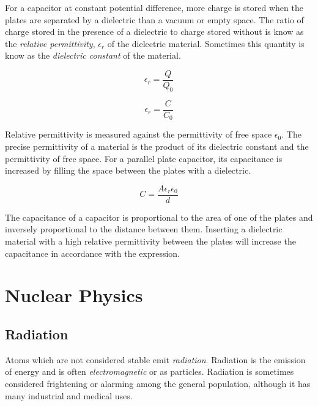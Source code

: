 \documentclass[12pt]{article}
\begin{document}
For a capacitor at constant potential difference, more charge is stored when the plates are separated by a dielectric than a vacuum or empty space. The ratio of charge stored in the presence of a dielectric to charge stored without is know as the \emph{relative permittivity}, \(\epsilon_r\) of the dielectric material. Sometimes this quantity is know as the \emph{dielectric constant} of the material.

\begin{figure}[H]
\centering
\begin{minipage}{0.8\textwidth}
\begin{tcolorbox}[
sharp corners=all,
colback=white,
colframe=white,
size=tight,
boxrule=0.2mm,
left=10mm, right=10mm
]
\begin{multicols}{2}
\[{\epsilon}_r = \dfrac{Q}{Q_0}\]

\columnbreak

\[{\epsilon}_r = \dfrac{C}{C_0}\]
\end{multicols}
\end{tcolorbox}
\end{minipage}
\end{figure}

Relative permittivity is measured against the permittivity of free space \(\epsilon_0\). The precise permittivity of a material is the product of its dielectric constant and the permittivity of free space. For a parallel plate capacitor, its capacitance is increased by filling the space between the plates with a dielectric.

\[C = \dfrac{A {\epsilon}_r {\epsilon}_0}{d}\]

The capacitance of a capacitor is proportional to the area of one of the plates and inversely proportional to the distance between them. Inserting a dielectric material with a high relative permittivity between the plates will increase the capacitance in accordance with the expression.

\section{Nuclear Physics}
\label{sec:org6636074}
\subsection{Radiation}
\label{sec:org7eaf46c}

Atoms which are not considered stable emit \emph{radiation}. Radiation is the emission of energy and is often \emph{electromagnetic} or as particles. Radiation is sometimes considered frightening or alarming among the general population, although it has many industrial and medical uses.
\end{document}
